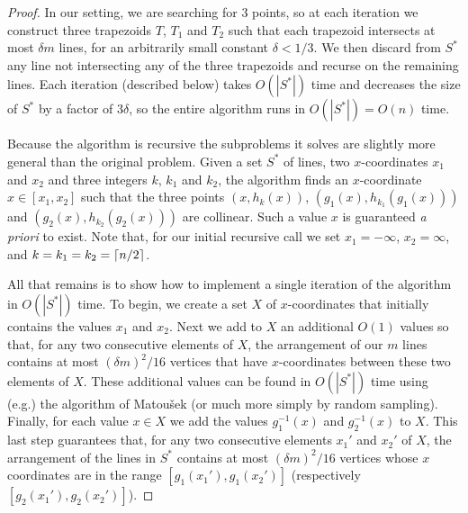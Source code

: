 \documentclass{dmtcs}
\begin{document}
\begin{proof}
In our setting, we are searching for 3 points, so at each iteration we
construct three trapezoids $T$, $T_1$ and $T_2$ such that each
trapezoid intersects at most $\delta m$ lines, for an arbitrarily
small constant $\delta < 1/3$.  We then discard from $S^*$ any line
not intersecting any of the three trapezoids and recurse on the
remaining lines.  Each iteration (described below) takes $O(|S^*|)$
time and decreases the size of $S^*$ by a factor of $3\delta$, so the
entire algorithm runs in $O(|S^*|)=O(n)$ time.

Because the algorithm is recursive the subproblems it solves are
slightly more general than the original problem.  Given a set $S^*$ of
lines, two $x$-coordinates $x_1$ and $x_2$ and three integers $k$,
$k_1$ and $k_2$, the algorithm finds an $x$-coordinate $x\in[x_1,x_2]$
such that the three points $(x,h_k(x))$, $(g_1(x),h_{k_1}(g_1(x)))$
and $(g_2(x),h_{k_2}(g_2(x)))$ are collinear.  Such a value $x$ is
guaranteed \emph{a priori} to exist.  Note that, for our initial
recursive call we set $x_1=-\infty$, $x_2=\infty$, and
$k=k_1=k_2=\left\lceil n/2 \right\rceil$.

All that remains is to show how to implement a single iteration of the
algorithm in $O(|S^*|)$ time.  To begin, we create a set $X$ of
$x$-coordinates that initially contains the values $x_1$ and $x_2$.
Next we add to $X$ an additional $O(1)$ values so that, for any two
consecutive elements of $X$, the arrangement of our $m$ lines contains
at most $(\delta m)^2/16$ vertices that have $x$-coordinates between
these two elements of $X$.  These additional values can be found in
$O(|S^*|)$ time using (e.g.) the algorithm of Matou\v{s}ek \cite{m91}
(or much more simply by random sampling).  Finally, for each value
$x\in X$ we add the values $g_1^{-1}(x)$ and $g_2^{-1}(x)$ to $X$.
This last step guarantees that, for any two consecutive elements
$x_1'$ and $x_2'$ of $X$, the arrangement of the lines in $S^*$
contains at most $(\delta m)^2/16$ vertices whose $x$ coordinates are
in the range $[g_1(x_1'),g_1(x_2')]$ (respectively
$[g_2(x_1'),g_2(x_2')]$). 


\end{proof}
\end{document}
